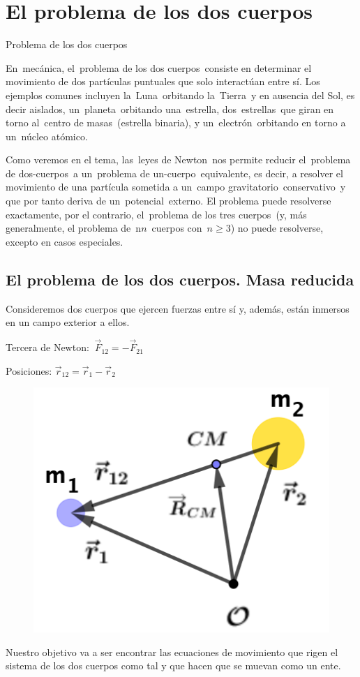 \chapter{El problema de los dos cuerpos}

\begin{miparrafo}
Problema de los dos cuerpos

En mecánica, el problema de los dos cuerpos consiste en determinar el movimiento de dos partículas puntuales que solo interactúan entre sí. Los ejemplos comunes incluyen la Luna orbitando la Tierra y en ausencia del Sol, es decir aislados, un planeta orbitando una estrella, dos estrellas que giran en torno al centro de masas (estrella binaria), y un electrón orbitando en torno a un núcleo atómico. 

Como veremos en el tema, las leyes de Newton nos permite reducir el problema de dos-cuerpos a un problema de un-cuerpo equivalente, es decir, a resolver el movimiento de una partícula sometida a un campo gravitatorio conservativo y que por tanto deriva de un potencial externo.  El problema puede resolverse exactamente, por el contrario, el problema de los tres cuerpos (y, más generalmente, el problema de n$n$ cuerpos con $n\geq 3$) no puede resolverse, excepto en casos especiales.	
\end{miparrafo}

\section[El problema de los dos cuerpos. Masa reducida]{El problema de los dos cuerpos. Masa reducida}

\begin{multicols}{2}
Consideremos dos cuerpos que ejercen fuerzas entre sí y, además, están inmersos en un campo exterior a ellos.

Tercera de Newton: $\ \vec F_{12}=-\vec F_{21}$

Posiciones: $\vec r_{12}=\vec r_1- \vec r_2$

\begin{figure}[H]
	\centering
	\includegraphics[width=.4\textwidth]{imagenes/imagenes13/T13IM01.png}
\end{figure}
\end{multicols}
Nuestro objetivo va a ser encontrar las ecuaciones de movimiento que rigen el sistema de los dos cuerpos como tal y que hacen que se muevan como un ente.

